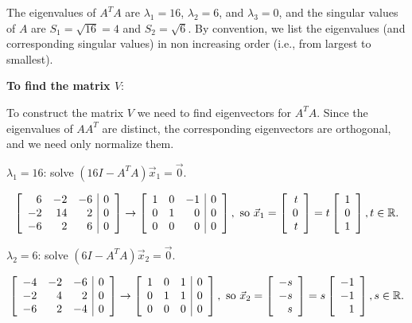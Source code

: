 \documentclass{ximera}
\begin{document}
\begin{example}
\begin{explanation}
The eigenvalues of $A^TA$ are $\lambda_1=16$, $\lambda_2=6$, and
$\lambda_3=0$, and the singular values of $A$ are $S_1=\sqrt{16}=4$ and
$S_2=\sqrt{6}$.
By convention, we list the eigenvalues (and corresponding singular values)
in non increasing order (i.e., from largest to smallest).
 
\textbf{To find the matrix $V$}:
 
To construct the matrix $V$ we need to find eigenvectors for $A^TA$.
Since the eigenvalues of $AA^T$ are distinct, the corresponding
eigenvectors are orthogonal, and we need only normalize them.
 
$\lambda_1=16$: solve $(16I-A^TA)\vec{x}_1= \vec{0}$.
 
\[ \left[\begin{array}{rrr|r}
6 & -2 & -6 & 0 \\ -2 & 14 & 2 & 0 \\ -6 & 2 & 6 & 0
\end{array}\right]
\rightarrow
\left[\begin{array}{rrr|r}
1 & 0 & -1 & 0 \\ 0 & 1 & 0 & 0 \\ 0 & 0 & 0 & 0
\end{array}\right],
\mbox{ so }
\vec{x}_1 =\left[\begin{array}{r} t \\ 0 \\ t \end{array}\right]
=t\left[\begin{array}{r} 1 \\ 0 \\ 1 \end{array}\right],
t\in \mathbb{R}. \]
 
$\lambda_2=6$: solve $(6I-A^TA)\vec{x}_2= \vec{0}$.
 
\[ \left[\begin{array}{rrr|r}
-4 & -2 & -6 & 0 \\ -2 & 4 & 2 & 0 \\ -6 & 2 & -4 & 0
\end{array}\right]
\rightarrow
\left[\begin{array}{rrr|r}
1 & 0 & 1 & 0 \\ 0 & 1 & 1 & 0 \\ 0 & 0 & 0 & 0
\end{array}\right],
\mbox{ so }
\vec{x}_2=\left[\begin{array}{r} -s \\ -s \\ s \end{array}\right]
=s\left[\begin{array}{r} -1 \\ -1 \\ 1 \end{array}\right],
s\in \mathbb{R}. \]
 

\end{explanation}
\end{example}
\end{document}
